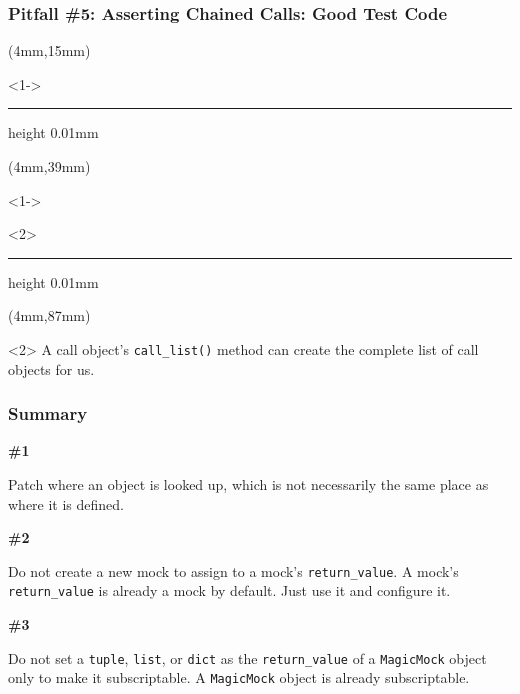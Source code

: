 \documentclass[xcolor={svgnames}]{beamer}
\newcommand{\pycode}[2][]{\lstinline[style=python,#1]{#2}}
\newcommand{\pyfile}[2][]{}
\newcommand{\hr}[2]{\vspace{#1}\hrule height 0.01mm\vspace{#2}}
\begin{document}
\begin{frame}[t,fragile]
    \frametitle{Pitfall \#5: Asserting Chained Calls: Good Test Code}
    \begin{textblock*}{\textwidth}(4mm,15mm)
        \begin{onlyenv}<1->
        \pyfile[style=scriptsize,linerange={1-1,7-11}]{
            examples/ex4/app.py
        }
        \hr{0mm}{0mm}
        \end{onlyenv}
    \end{textblock*}

    \begin{textblock*}{\textwidth}(4mm,39mm)
        \begin{onlyenv}<1->
        \pyfile[style=scriptsize,linerange={1-1,8-12,23}]{
            examples/ex4/testapp.py
        }
        \end{onlyenv}
        \begin{onlyenv}<2>
        \hr{0mm}{0mm}
        \end{onlyenv}
    \end{textblock*}

    \begin{textblock*}{\textwidth}(4mm,87mm)
        \footnotesize
        \begin{onlyenv}<2>
        A call object's \pycode{call_list()} method can create the
        complete list of call objects for us.
        \end{onlyenv}
    \end{textblock*}
\end{frame}


\begin{frame}[t]
    \frametitle{Summary}
    \small

    \textbf{\#1}

    Patch where an object is looked up, which is not necessarily
    the same place as where it is defined.
    \pause

    \bigskip

    \textbf{\#2}

    Do not create a new mock to assign to a mock's
    \pycode{return_value}. A mock's \pycode{return_value} is already
    a mock by default. Just use it and configure it.
    \pause

    \bigskip

    \textbf{\#3}

    Do not set a \pycode{tuple}, \pycode{list}, or \pycode{dict} as
    the \pycode{return_value} of a \pycode{MagicMock} object only to
    make it subscriptable. A \pycode{MagicMock} object is already
    subscriptable.
\end{frame}
\end{document}
